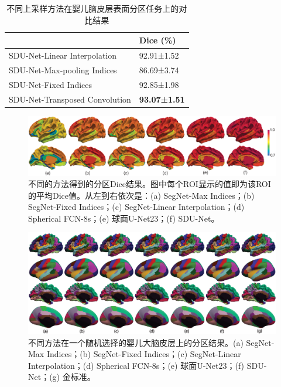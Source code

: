 \begin{table}[t]
		\caption{不同上采样方法在婴儿脑皮层表面分区任务上的对比结果}
		\label{tab:上采样方法比较}
		\centering
		\begin{tabularx}{0.75\linewidth}{X<{\centering} | X<{\centering}}
			\hline
			& Dice (\%)        \\
			\hline		  
			SDU-Net-Linear Interpolation     &     92.91±1.52   \\
			SDU-Net-Max-pooling Indices      &     86.69±3.74   \\
			SDU-Net-Fixed Indices            &     92.85±1.98    \\
			SDU-Net-Transposed Convolution   &	   \textbf{93.07±1.51}  \\
			\hline					 
		\end{tabularx}
\end{table}

\begin{figure}[t]
	\centering
	\includegraphics[width=\linewidth]{figure/figure_roi_result.eps}
	\caption{不同的方法得到的分区Dice结果。图中每个ROI显示的值即为该ROI的平均Dice值。从左到右依次是：(a) SegNet-Max Indices；(b) SegNet-Fixed Indices；(c) SegNet-Linear Interpolation；(d) Spherical FCN-8s；(e) 球面U-Net23；(f) SDU-Net。}
	\label{fig:par_results_roiwise}
\end{figure}

\begin{figure}[t]
	\centering
	\includegraphics[width=\linewidth]{figure/figure_parcellation_result.eps}
	\caption{不同方法在一个随机选择的婴儿大脑皮层上的分区结果。(a) SegNet-Max Indices；(b) SegNet-Fixed Indices；(c) SegNet-Linear Interpolation；(d) Spherical FCN-8s；(e) 球面U-Net23；(f) SDU-Net；(g) 金标准。}
	\label{fig:par_results_35}
\end{figure}

